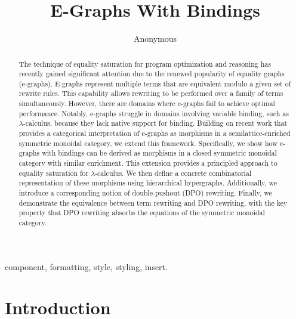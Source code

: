\documentclass[]{IEEEtran}
\begin{document}
\title{E-Graphs With Bindings
}


\author{Anonymous}

\maketitle

\begin{abstract}
    The technique of equality saturation for program optimization and reasoning has recently gained significant attention due to the renewed popularity of equality graphs (e-graphs).
    E-graphs represent multiple terms that are equivalent modulo a given set of rewrite rules. 
    This capability allows rewriting to be performed over a family of terms simultaneously.    
    However, there are domains where e-graphs fail to achieve optimal performance. Notably, e-graphs struggle in domains involving variable binding, such as $\lambda$-calculus, because they lack native support for binding.
    Building on recent work that provides a categorical interpretation of e-graphs as morphisms in a semilattice-enriched symmetric monoidal category, we extend this framework. Specifically, we show how e-graphs with bindings can be derived as morphisms in a closed symmetric monoidal category with similar enrichment. This extension provides a principled approach to equality saturation for $\lambda$-calculus.
    We then define a concrete combinatorial representation of these morphisms using hierarchical hypergraphs. Additionally, we introduce a corresponding notion of double-pushout (DPO) rewriting. Finally, we demonstrate the equivalence between term rewriting and DPO rewriting, with the key property that DPO rewriting absorbs the equations of the symmetric monoidal category.
\end{abstract}

\begin{IEEEkeywords}
component, formatting, style, styling, insert.
\end{IEEEkeywords}

\section{Introduction}
\end{document}
